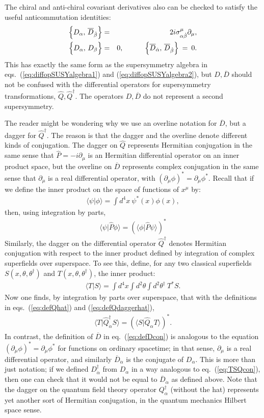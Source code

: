 \documentclass[12pt]{article}
\def\beq{\begin{eqnarray}}
\def\eeq{\end{eqnarray}}
\def\Dcon{\overline D}
\begin{document}
The chiral and anti-chiral covariant derivatives also can be checked to 
satisfy the useful 
anticommutation identities:
\beq
\Bigl \lbrace D_\alpha,\, \Dcon_{\dot\beta} \Bigr \rbrace  &=& 
2 i \sigma^\mu_{\alpha\dot\beta}\partial_\mu,
\label{eq:diffopderivs}
\\
\Bigl \lbrace D_\alpha,\, D_{\beta} \Bigr \rbrace &=& 0,\qquad\quad
\Bigl \lbrace \Dcon_{\dot \alpha},\,
              \Dcon_{\dot\beta} \Bigr \rbrace \>=\> 0.
\label{eq:diffopderivs2}
\eeq
This has exactly the same form as the supersymmetry algebra in 
eqs.~(\ref{eq:diffopSUSYalgebra1}) and (\ref{eq:diffopSUSYalgebra2}),
but $D, \Dcon$ should not be 
confused with 
the differential operators for supersymmetry transformations,
$\hat Q, \hat Q^\dagger$. The operators $D, \Dcon$ do not represent a second supersymmetry.

The reader might be wondering why we use an overline notation for $\Dcon$, but a dagger
for $\hat Q^\dagger$. The reason is that the dagger and the overline 
denote different kinds of conjugation. The dagger
on $\hat Q$ represents Hermitian conjugation in the same sense that 
$\hat P = -i \partial_\mu$ is an Hermitian differential operator on an 
inner product space, but the overline on $\Dcon$ represents 
complex conjugation in the same sense that
$\partial_\mu$ is a real differential operator, with 
$(\partial_\mu \phi)^* = \partial_\mu \phi^*$. Recall that if we 
define the inner product on the space of functions of $x^\mu$ by:
\beq
\langle \psi | \phi \rangle = \int \!d^4x\> \psi^*(x) \phi(x),
\eeq
then, using integration by parts,
\beq 
\langle \psi| \hat P \phi \rangle = \left (\langle \phi| \hat P \psi \rangle\right )^*
\eeq
Similarly, the dagger on the differential operator $\hat Q^\dagger$ denotes Hermitian
conjugation with respect to the inner product defined by integration of 
complex superfields over superspace. To see this, define, for any 
two classical superfields
$S(x,\theta,\theta^\dagger)$ and $T(x,\theta,\theta^\dagger)$, the inner product:
\beq
\langle T | S \rangle = \int d^4x\int\! d^2\theta\! \int\! d^2\theta^\dagger\> T^* S.
\eeq
Now one finds, by integration by parts over superspace, that with the definitions
in eqs.~(\ref{eq:defQhat}) and (\ref{eq:defQdaggerhat}),
\beq
\langle T | \hat Q^\dagger_{\dot\alpha} S \rangle = 
\left ( \langle S |\hat Q_\alpha T \rangle \right )^* .
\label{eq:TSQcon}
\eeq
In contrast, the definition of $\Dcon$ in eq.~(\ref{eq:defDcon}) is analogous
to the equation $(\partial_\mu \phi)^* = \partial_\mu \phi^*$ for functions 
on ordinary spacetime; in that sense, $\partial_\mu$ is a real differential operator,
and similarly $\Dcon_{\dot\alpha}$ is the conjugate of $D_\alpha$. 
This is more than just notation; if we
defined $D^\dagger_{\dot\alpha}$ from $D_\alpha$ in a way analogous to 
eq.~(\ref{eq:TSQcon}), then one can check that 
it would not be equal to $\Dcon_{\dot\alpha}$ as defined above. 
Note that the dagger on the quantum field theory operator $Q^\dagger_{\alpha}$ 
(without the hat) represents yet another sort of Hermitian conjugation, 
in the quantum mechanics Hilbert space sense. 
 
\end{document}
